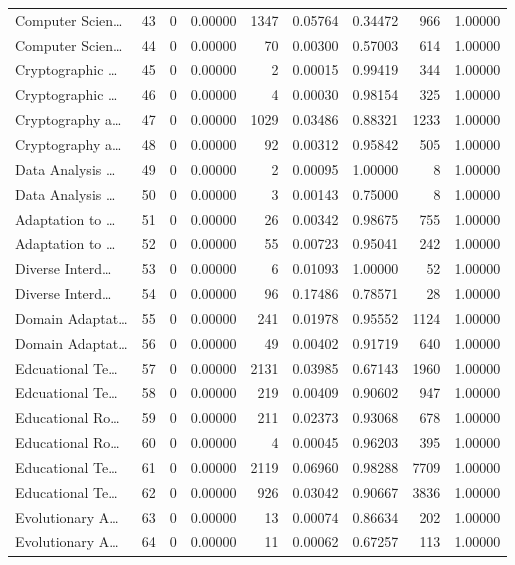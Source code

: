 \begin{table}
\begin{tabular}{lrrrrrrrr}
Computer Scien… & 43 & 0 & 0.00000 & 1347 & 0.05764 & 0.34472 & 966 & 1.00000 \\
Computer Scien… & 44 & 0 & 0.00000 & 70 & 0.00300 & 0.57003 & 614 & 1.00000 \\
Cryptographic … & 45 & 0 & 0.00000 & 2 & 0.00015 & 0.99419 & 344 & 1.00000 \\
Cryptographic … & 46 & 0 & 0.00000 & 4 & 0.00030 & 0.98154 & 325 & 1.00000 \\
Cryptography a… & 47 & 0 & 0.00000 & 1029 & 0.03486 & 0.88321 & 1233 & 1.00000 \\
Cryptography a… & 48 & 0 & 0.00000 & 92 & 0.00312 & 0.95842 & 505 & 1.00000 \\
Data Analysis … & 49 & 0 & 0.00000 & 2 & 0.00095 & 1.00000 & 8 & 1.00000 \\
Data Analysis … & 50 & 0 & 0.00000 & 3 & 0.00143 & 0.75000 & 8 & 1.00000 \\
Adaptation to … & 51 & 0 & 0.00000 & 26 & 0.00342 & 0.98675 & 755 & 1.00000 \\
Adaptation to … & 52 & 0 & 0.00000 & 55 & 0.00723 & 0.95041 & 242 & 1.00000 \\
Diverse Interd… & 53 & 0 & 0.00000 & 6 & 0.01093 & 1.00000 & 52 & 1.00000 \\
Diverse Interd… & 54 & 0 & 0.00000 & 96 & 0.17486 & 0.78571 & 28 & 1.00000 \\
Domain Adaptat… & 55 & 0 & 0.00000 & 241 & 0.01978 & 0.95552 & 1124 & 1.00000 \\
Domain Adaptat… & 56 & 0 & 0.00000 & 49 & 0.00402 & 0.91719 & 640 & 1.00000 \\
Edcuational Te… & 57 & 0 & 0.00000 & 2131 & 0.03985 & 0.67143 & 1960 & 1.00000 \\
Edcuational Te… & 58 & 0 & 0.00000 & 219 & 0.00409 & 0.90602 & 947 & 1.00000 \\
Educational Ro… & 59 & 0 & 0.00000 & 211 & 0.02373 & 0.93068 & 678 & 1.00000 \\
Educational Ro… & 60 & 0 & 0.00000 & 4 & 0.00045 & 0.96203 & 395 & 1.00000 \\
Educational Te… & 61 & 0 & 0.00000 & 2119 & 0.06960 & 0.98288 & 7709 & 1.00000 \\
Educational Te… & 62 & 0 & 0.00000 & 926 & 0.03042 & 0.90667 & 3836 & 1.00000 \\
Evolutionary A… & 63 & 0 & 0.00000 & 13 & 0.00074 & 0.86634 & 202 & 1.00000 \\
Evolutionary A… & 64 & 0 & 0.00000 & 11 & 0.00062 & 0.67257 & 113 & 1.00000 \\

\end{tabular}
\end{table}
